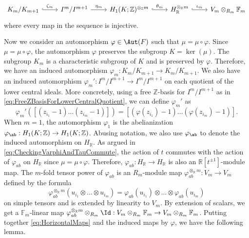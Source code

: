 \documentclass{amsart}
\begin{document}
\begin{equation}
    \label{eq:HorizontalMaps}
    \begin{tikzcd}
     K_m/K_{m+1} \arrow[hookrightarrow]{r}{\zeta_m} & 
     I^{m}/I^{m+1} \arrow[r,"\eta_m"] &
     H_1(K;\mathbb{Z})^{\otimes_{\mathbb{Z}} m} \arrow[hookrightarrow]{r}{\theta_m} & 
     H_\mathbb{R}^{\otimes_{\mathbb{R}} m} \arrow[hookrightarrow]{r}{\iota_m}&
     V_m \otimes_{R_m} \mathbb{F}_m
    \end{tikzcd}
\end{equation}
where every map in the sequence is injective. 


Now we consider an automorphism $\varphi \in \Aut(F)$ such that $\mu = \mu \circ \varphi$. Since $\mu = \mu \circ \varphi$, the automorphism $\varphi$ preserves the subgroup $K = \ker(\mu)$. The subgroup $K_m$ is a characteristic subgroup of $K$ and is preserved by $\varphi$. Therefore, we have an induced automorphism $\varphi_m:K_m/K_{m+1} \to K_m/K_{m+1}$. We also have an induced automorphism $\varphi_m':I^{m}/I^{m+1} \to I^{m}/I^{m+1}$ on each quotient of the lower central ideals. More concretely, using a free $\mathbb{Z}$-basis for $I^m/I^{m+1}$ as in \cref{eq:FreeZBasisForLowerCentralQuotient}, we can define $\varphi_m'$ as 
\[
\varphi_m'( [(z_{i_1}-1)\dots (z_{i_m}-1)]) = [(\varphi(z_{i_1})-1)\dots (\varphi(z_{i_m})-1)]. 
\]
When $m=1$, the automorphism $\varphi_1$ is the abelianization $\varphi_{\ab}:H_1(K;\mathbb{Z}) \to H_1(K;\mathbb{Z})$. Abusing notation, we also use $\varphi_{\ab}$ to denote the induced automorphism on $H_\mathbb{R}$. As argued in \cref{eq:CheckingVarphiAndTauCommute}, the action of $t$ commutes with the action of $\varphi_{ab}$ on $H_{\mathbb{R}}$ since $\mu = \mu \circ \varphi$. Therefore, $\varphi_{ab}:H_\mathbb{R} \to H_\mathbb{R}$ is also an $\mathbb{R}[t^{\pm 1}]$-module map. The $m$-fold tensor power of $\varphi_{ab}$ is an $R_m$-module map $\varphi_{ab}^{\otimes_{\mathbb{R}} m}: V_m \to V_m$ defined by the formula
\[
\varphi_{ab}^{\otimes_{\mathbb{R}} m}(u_{i_1}\otimes \dots \otimes u_{i_m}) = \varphi_{ab}(u_{i_1})\otimes \dots \otimes \varphi_{ab}(u_{i_m})
\]
on simple tensors and is extended by linearity to $V_m$. By extension of scalars, we get a $\mathbb{F}_m$-linear map $\varphi^{\otimes_\mathbb{R} m}_{ab} \otimes_{R_m} \Id: V_m \otimes_{R_m}\mathbb{F}_m \to V_m \otimes_{R_m} \mathbb{F}_m$. Putting together \cref{eq:HorizontalMaps} and the induced maps by $\varphi$, we have the following lemma. 
\end{document}

